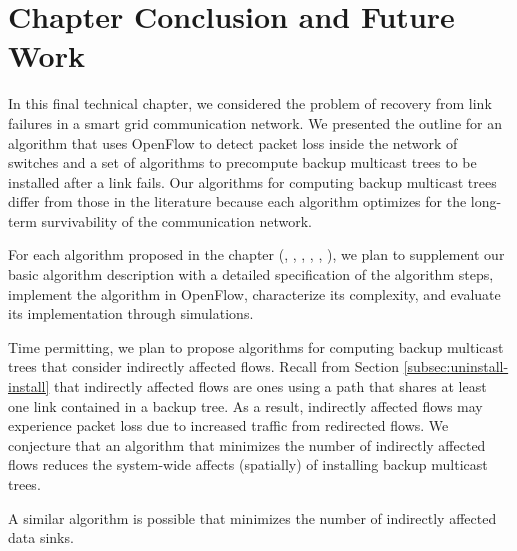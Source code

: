 \section{Chapter Conclusion and Future Work}
\label{sec:conclude}

In this final technical chapter, we considered the problem of recovery from link failures in a smart grid communication network.  We presented the outline for an 
algorithm that uses OpenFlow to detect packet loss inside the network of switches and a set of algorithms to precompute backup multicast trees to be installed after
a link fails.  Our algorithms for computing backup multicast trees differ from those in the literature because each algorithm optimizes for the long-term survivability of the 
communication network. 


For each algorithm proposed in the chapter (\mdrs, \fls, \pcnts, \mfs, \mds, \mcs), we plan to supplement our basic algorithm description with a detailed specification of the algorithm steps,
implement the algorithm in OpenFlow, characterize its complexity, and evaluate its implementation through simulations.

Time permitting, we plan to propose algorithms for computing backup multicast trees that consider indirectly affected flows.  
Recall from Section \ref{subsec:uninstall-install} that indirectly affected flows are ones using a path that shares at least one link contained in a backup tree.
As a result, indirectly affected flows may experience packet loss due to increased traffic from redirected flows.  We conjecture that 
an algorithm that minimizes the number of indirectly affected flows reduces the system-wide affects (spatially) of installing backup multicast trees.


A similar algorithm is possible that minimizes the number of indirectly affected data sinks.








